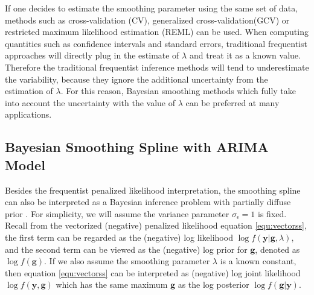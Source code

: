 \documentclass{article}
\begin{document}
If one decides to estimate the smoothing parameter using the same set of data, methods such as cross-validation (CV), generalized cross-validation(GCV) or restricted maximum likelihood estimation (REML) can be used. When computing quantities such as confidence intervals and standard errors, traditional frequentist approaches will directly plug in the estimate of $\lambda$ and treat it as a known value. Therefore the traditional frequentist inference methods will tend to underestimate the variability, because they ignore the additional uncertainty from the estimation of $\lambda$. For this reason, Bayesian smoothing methods which fully take into account the uncertainty with the value of $\lambda$ can be preferred at many applications.










\subsection{Bayesian Smoothing Spline with ARIMA Model}\label{ARIMA}

Besides the frequentist penalized likelihood interpretation, the smoothing spline can also be interpreted as a Bayesian inference problem with partially diffuse prior \citep{ARIMA}. For simplicity, we will assume the variance parameter $\sigma_\epsilon = 1$ is fixed.
Recall from the vectorized (negative) penalized likelihood equation \ref{equ:vectorss}, the first term can be regarded as the (negative) log likelihood $\log f(\boldsymbol{y}|\boldsymbol{g},\lambda)$, and the second term can be viewed as the (negative) log prior for $\boldsymbol{g}$, denoted as $\log f(\boldsymbol{g})$. If we also assume the smoothing parameter $\lambda$ is a known constant, then equation \ref{equ:vectorss} can be interpreted as (negative) log joint likelihood $\log f(\boldsymbol{y},\boldsymbol{g})$ which has the same maximum $\hat{\boldsymbol{g}}$ as the log posterior $\log f(\boldsymbol{g}|\boldsymbol{y})$.
\end{document}
